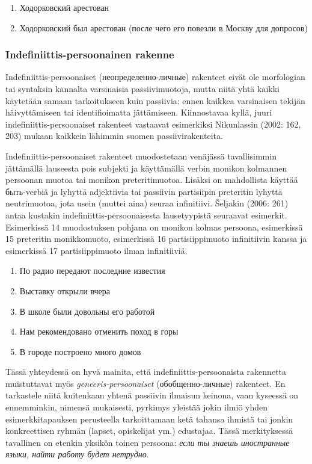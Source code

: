 \documentclass[]{scrartcl}
\providecommand{\tightlist}{%
  \setlength{\itemsep}{0pt}\setlength{\parskip}{0pt}}
\begin{document}
\begin{enumerate}
\def\labelenumi{(\arabic{enumi})}
\setcounter{enumi}{11}
\tightlist
\item
  Ходорковский арестован
\item
  Ходорковский был арестован (после чего его повезли в Москву для
  допросов)
\end{enumerate}

\subsubsection{Indefiniittis-persoonainen
rakenne}\label{indefiniittis-persoonainen-rakenne}

Indefiniittis-persoonaiset (неопределенно-личные) rakenteet eivät ole
morfologian tai syntaksin kannalta varsinaisia passiivimuotoja, mutta
niitä yhtä kaikki käytetään samaan tarkoitukseen kuin passiivia: ennen
kaikkea varsinaisen tekijän häivyttämiseen tai identifioimatta
jättämiseen. Kiinnostavaa kyllä, juuri indefiniittis-persoonaiset
rakenteet vastaavat esimerkiksi Nikunlassin (2002: 162, 203) mukaan
kaikkein lähimmin suomen passiivirakenteita.

Indefiniittis-persoonaiset rakenteet muodostetaan venäjässä
tavallisimmin jättämällä lauseesta pois subjekti ja käyttämällä verbin
monikon kolmannen persoonan muotoa tai monikon preteritimuotoa. Lisäksi
on mahdollista käyttää быть-verbiä ja lyhyttä adjektiivia tai passiivin
partisiipin preteritin lyhyttä neutrimuotoa, jota usein (muttei aina)
seuraa infinitiivi. Šeljakin (2006: 261) antaa kustakin
indefiniittis-persoonaisesta lausetyypistä seuraavat esimerkit.
Esimerkissä 14 muodostuksen pohjana on monikon kolmas persoona,
esimerkissä 15 preteritin monikkomuoto, esimerkissä 16 partisiippimuoto
infinitiivin kanssa ja esimerkissä 17 partisiippimuoto ilman
infinitiiviä.

\begin{enumerate}
\def\labelenumi{(\arabic{enumi})}
\setcounter{enumi}{13}
\tightlist
\item
  По радио передают последние известия
\item
  Выставку открыли вчера
\item
  В школе были довольны его работой
\item
  Нам рекомендовано отменить поход в горы
\item
  В городе построено много домов
\end{enumerate}

Tässä yhteydessä on hyvä mainita, että indefiniittis-persoonaista
rakennetta muistuttavat myös \emph{geneeris-persoonaiset}
(обобщенно-личные) rakenteet. En tarkastele niitä kuitenkaan yhtenä
passiivin ilmaisun keinona, vaan kyseessä on ennemminkin, nimensä
mukaisesti, pyrkimys yleistää jokin ilmiö yhden esimerkkitapauksen
perusteella tarkoittamaan ketä tahansa ihmistä tai jonkin konkreettisen
ryhmän (lapset, opiskelijat ym.) edustajaa. Tässä merkityksessä
tavallinen on etenkin yksikön toinen persoona: \emph{если ты знаешь
иностранные языки, найти работу будет нетрудно}.
\end{document}

